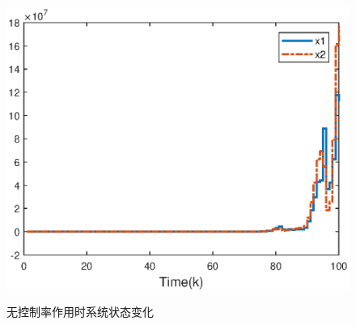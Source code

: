 \begin{figure}[!htb]
	\centering\includegraphics[scale=0.6]{./figures/lure_system/unstable_state2.eps}\\
	\caption{无控制率作用时系统状态变化}
	\label{fig5}
\end{figure}

